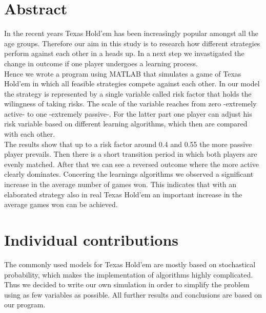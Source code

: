 \documentclass[11pt]{article}
\begin{document}



\tableofcontents

\newpage




\section{Abstract}
In the recent years Texas Hold'em has been increasingly popular amongst all the age groups. Therefore our aim in this study is to research how different strategies perform against each other in a heads up. In a next step we invastigated the change in outcome if one player undergoes a learning process. \\
Hence we wrote a program using MATLAB that simulates a game of Texas Hold'em in which all feasible strategies compete against each other. In our model the strategy is represented by a single variable called risk factor that holds the wilingness of taking risks. The scale of the variable reaches from zero -extremely active- to one -extremely passive-. For the latter part one player can adjust his risk variable based on different learning algorithms, which then are compared with each other.\\
The results show that up to a risk factor around 0.4 and 0.55 the more passive player prevails. Then there is a short transition period in which both players are evenly matched. After that we can see a reversed outcome where the more active clearly dominates. Concering the learnings algorithms we observed a significant increase in the average number of games won. This indicates that with an elaborated strategy also in real Texas Hold'em an important increase in the average games won can be achieved. 

\section{Individual contributions}

The commonly used models for Texas Hold'em are mostly based on stochastical probability, which makes the implementation of algorithms highly complicated. Thus we decided to write our own simulation in order to simplify the problem using as few variables as possible. All further results and conclusions are based on our program.
\end{document}
